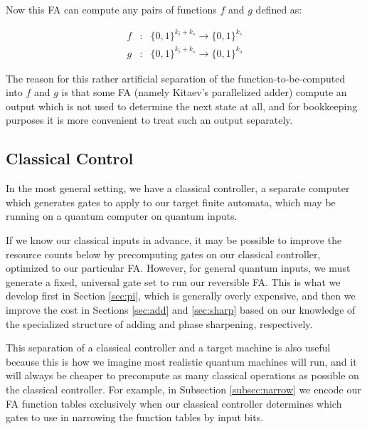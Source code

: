 Now this FA can compute any pairs of functions $f$ and $g$ defined as:

\begin{eqnarray}
f & : &\{0,1\}^{k_i+k_s} \rightarrow \{0,1\}^{k_s} \\
g & : & \{0,1\}^{k_i+k_s} \rightarrow \{0,1\}^{k_o}
\end{eqnarray}

The reason for this rather artificial separation of the function-to-be-computed
into $f$ and $g$ is that some FA (namely Kitaev's parallelized adder) compute
an output which is not used to determine the next state at all, and for
bookkeeping purposes it is more convenient to treat such an output separately.

\subsection{Classical Control}

In the most general setting, we have a classical controller, a separate
computer which generates gates to apply to our target finite automata,
which may be running on a quantum computer on quantum inputs.

If we know our classical inputs in advance, it may be possible to
improve the resource counts below by precomputing gates on our classical
controller, optimized to our particular FA. However, for general quantum
inputs, we must generate a fixed, universal gate set to run our
reversible FA. This is what we develop first in Section \ref{sec:pi}, which
is generally overly expensive, and then we improve the cost in
Sections \ref{sec:add} and \ref{sec:sharp} based on our knowledge
of the specialized structure of adding and phase sharpening, respectively.

This separation of a classical controller and a target machine is also
useful because this is how we imagine most realistic quantum machines
will run, and it will always be cheaper to precompute as many
classical operations as possible on the classical controller. For
example, in Subsection \ref{subsec:narrow} we encode our FA function
tables exclusively when our classical controller determines which
gates to use in narrowing the function tables by input bits.

